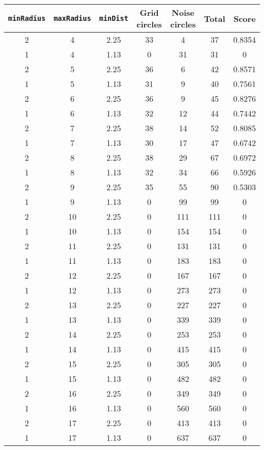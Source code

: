 \documentclass[letterpaper, 12pt]{article}
\begin{document}
\begin{longtable}{|c|c|c|c|c|c|c|}
\hline
\textbf{\texttt{minRadius}} & \textbf{\texttt{maxRadius}} & \textbf{\texttt{minDist}} & \textbf{Grid circles} & \textbf{Noise circles} & \textbf{Total} & \textbf{Score} \\
\hline
2 & 4 & 2.25 & 33 & 4 & 37 & 0.8354 \\
\hline
1 & 4 & 1.13 & 0 & 31 & 31 & 0 \\
\hline
2 & 5 & 2.25 & 36 & 6 & 42 & 0.8571 \\
\hline
1 & 5 & 1.13 & 31 & 9 & 40 & 0.7561 \\
\hline
2 & 6 & 2.25 & 36 & 9 & 45 & 0.8276 \\
\hline
1 & 6 & 1.13 & 32 & 12 & 44 & 0.7442 \\
\hline
2 & 7 & 2.25 & 38 & 14 & 52 & 0.8085 \\
\hline
1 & 7 & 1.13 & 30 & 17 & 47 & 0.6742 \\
\hline
2 & 8 & 2.25 & 38 & 29 & 67 & 0.6972 \\
\hline
1 & 8 & 1.13 & 32 & 34 & 66 & 0.5926 \\
\hline
2 & 9 & 2.25 & 35 & 55 & 90 & 0.5303 \\
\hline
1 & 9 & 1.13 & 0 & 99 & 99 & 0 \\
\hline
2 & 10 & 2.25 & 0 & 111 & 111 & 0 \\
\hline
1 & 10 & 1.13 & 0 & 154 & 154 & 0 \\
\hline
2 & 11 & 2.25 & 0 & 131 & 131 & 0 \\
\hline
1 & 11 & 1.13 & 0 & 183 & 183 & 0 \\
\hline
2 & 12 & 2.25 & 0 & 167 & 167 & 0 \\
\hline
1 & 12 & 1.13 & 0 & 273 & 273 & 0 \\
\hline
2 & 13 & 2.25 & 0 & 227 & 227 & 0 \\
\hline
1 & 13 & 1.13 & 0 & 339 & 339 & 0 \\
\hline
2 & 14 & 2.25 & 0 & 253 & 253 & 0 \\
\hline
1 & 14 & 1.13 & 0 & 415 & 415 & 0 \\
\hline
2 & 15 & 2.25 & 0 & 305 & 305 & 0 \\
\hline
1 & 15 & 1.13 & 0 & 482 & 482 & 0 \\
\hline
2 & 16 & 2.25 & 0 & 349 & 349 & 0 \\
\hline
1 & 16 & 1.13 & 0 & 560 & 560 & 0 \\
\hline
2 & 17 & 2.25 & 0 & 413 & 413 & 0 \\
\hline
1 & 17 & 1.13 & 0 & 637 & 637 & 0 \\

\end{longtable}
\end{document}
